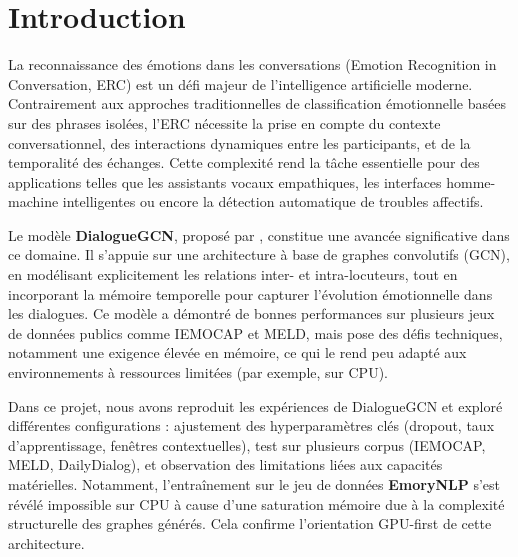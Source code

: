 \documentclass[a4paper,11pt]{article}
\begin{document}
\tableofcontents
\listoffigures
{}

\listoftables
{}
\newpage









\section{Introduction}
La reconnaissance des émotions dans les conversations (Emotion Recognition in Conversation, ERC) est un défi majeur de l’intelligence artificielle moderne. Contrairement aux approches traditionnelles de classification émotionnelle basées sur des phrases isolées, l’ERC nécessite la prise en compte du contexte conversationnel, des interactions dynamiques entre les participants, et de la temporalité des échanges. Cette complexité rend la tâche essentielle pour des applications telles que les assistants vocaux empathiques, les interfaces homme-machine intelligentes ou encore la détection automatique de troubles affectifs.

Le modèle \textbf{DialogueGCN}, proposé par \cite{ghosal2019dialoguegcn}, constitue une avancée significative dans ce domaine. Il s’appuie sur une architecture à base de graphes convolutifs (GCN), en modélisant explicitement les relations inter- et intra-locuteurs, tout en incorporant la mémoire temporelle pour capturer l’évolution émotionnelle dans les dialogues. Ce modèle a démontré de bonnes performances sur plusieurs jeux de données publics comme IEMOCAP et MELD, mais pose des défis techniques, notamment une exigence élevée en mémoire, ce qui le rend peu adapté aux environnements à ressources limitées (par exemple, sur CPU).

Dans ce projet, nous avons reproduit les expériences de DialogueGCN et exploré différentes configurations : ajustement des hyperparamètres clés (dropout, taux d’apprentissage, fenêtres contextuelles), test sur plusieurs corpus (IEMOCAP, MELD, DailyDialog), et observation des limitations liées aux capacités matérielles. Notamment, l’entraînement sur le jeu de données \textbf{EmoryNLP} s’est révélé impossible sur CPU à cause d’une saturation mémoire due à la complexité structurelle des graphes générés. Cela confirme l’orientation GPU-first de cette architecture.
\end{document}
